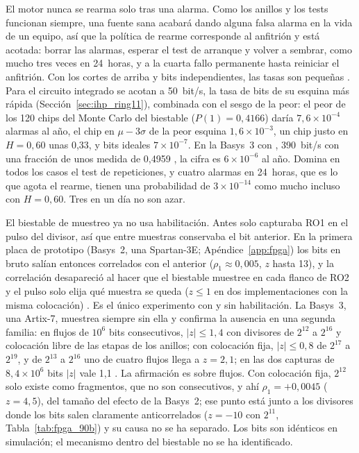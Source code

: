 El motor nunca se rearma solo tras una alarma. Como los anillos y los
tests funcionan siempre, una fuente sana acabará dando alguna falsa alarma
en la vida de un equipo, así que la política de rearme corresponde al
anfitrión y está acotada: borrar las alarmas, esperar el test de arranque
y volver a sembrar, como mucho tres veces en 24~horas, y a la cuarta
fallo permanente hasta reiniciar el anfitrión. Con los cortes de arriba y
bits independientes, las tasas son pequeñas \est{}. Para el circuito
integrado se acotan a 50~bit/s, la tasa de bits de su esquina más rápida
(Sección~\ref{sec:ihp_ring11}), combinada con el sesgo de la peor: el
peor de los 120 chips del Monte Carlo del biestable
($P(1) = 0{,}4166$) daría $7{,}6\times10^{-4}$ alarmas al año, el chip
en $\mu - 3\sigma$ de la peor esquina $1{,}6\times10^{-3}$, un chip
justo en $H = 0{,}60$ unas 0,33, y bits ideales $7\times10^{-7}$. En la
Basys~3 con , 390~bit/s con una fracción de unos medida de 0,4959
\meas{}, la cifra es $6\times10^{-6}$ al año. Domina en todos los casos
el test de repeticiones, y cuatro alarmas en 24~horas, que es lo que
agota el rearme, tienen una probabilidad de $3\times10^{-14}$ como
mucho incluso con $H = 0{,}60$. Tres en un día no son azar.

El biestable de muestreo ya no usa habilitación. Antes solo capturaba RO1
en el pulso del divisor, así que entre muestras conservaba el bit
anterior. En la primera placa de prototipo (Basys~2, una Spartan-3E;
Apéndice~\ref{app:fpga}) los bits en bruto salían entonces correlados
con el
anterior ($\rho_1 \approx 0{,}005$, $z$ hasta 13), y la correlación
desapareció al hacer que el biestable muestree en cada flanco de RO2 y el
pulso solo elija qué muestra se queda ($z \le 1$ en dos implementaciones
con la misma colocación) \meas{}. Es el único experimento con y sin
habilitación. La Basys~3, una Artix-7, muestrea siempre sin ella y
confirma la ausencia en una segunda familia: en flujos de $10^6$ bits
consecutivos, $|z| \le 1{,}4$ con divisores de $2^{12}$ a $2^{16}$ y
colocación libre de las etapas de los anillos; con colocación fija,
$|z| \le 0{,}8$ de $2^{17}$ a $2^{19}$, y de $2^{13}$ a $2^{16}$ uno de
cuatro flujos llega a $z = 2{,}1$; en las dos capturas de
$8{,}4\times10^6$ bits $|z|$ vale 1,1 \meas{}. La afirmación es sobre
flujos. Con colocación fija, $2^{12}$ solo existe como fragmentos, que
no son consecutivos, y ahí $\rho_1 = +0{,}0045$ ($z = 4{,}5$), del tamaño
del efecto de la Basys~2; ese punto está junto a los divisores donde
los bits salen claramente anticorrelados ($z = -10$ con $2^{11}$,
Tabla~\ref{tab:fpga_90b}) y su causa no se ha separado. Los bits son
idénticos
en simulación; el
mecanismo dentro del biestable no se ha identificado.

